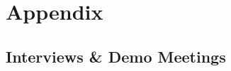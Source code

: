 \part*{Appendix}
\chapter{Interviews \& Demo Meetings}
\label{app:interview}

\newpage{}

\newpage{}

\newpage{}

\newpage{}

\pagebreak{}

\newpage{}

\newpage{}




